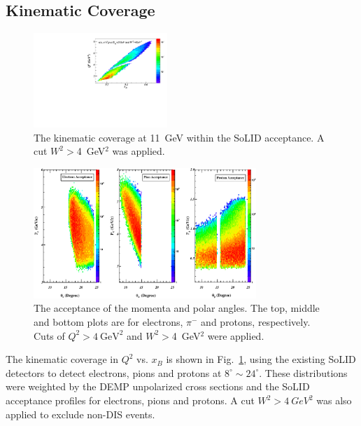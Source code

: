 \subsection{Kinematic Coverage}
\begin{figure}[!ht]
 \begin{center}
      \includegraphics[type=pdf,
        ext=.pdf,read=.pdf,width=0.45\textwidth]{./figures//Q2_x_02Hz}
  
   \caption{\footnotesize{The
kinematic coverage at 11~GeV within the SoLID acceptance. A cut $W^2>$4~GeV$^2$
was applied. }}
  \label{kin_cor}
  \end{center}
\end{figure}
\begin{figure}[!ht]
 \begin{center}
   \includegraphics[type=pdf,
     ext=.pdf,read=.pdf,width=0.75\textwidth]{./figures/dvmp_acceptance_narrow}
   \caption[The acceptance of the momenta and scattering angles for electrons,
     $\pi^{-}$ and protons]{\footnotesize{The acceptance of the momenta and
       polar angles. The top, middle and bottom plots are for electrons,
       $\pi^{-}$ and protons, respectively. Cuts of $Q^{2}>4~\mathrm{GeV^{2}}$
       and $W^2>$4~GeV$^2$ were applied.}}
  \label{p_theta}
  \end{center}
\end{figure}
The kinematic coverage in $Q^{2}$ vs. $x_{B}$ is shown in Fig.~\ref{kin_cor},
using the existing SoLID detectors to detect electrons, pions and protons at
$8^{\circ}\sim24^{\circ}$. These distributions were weighted by the DEMP
unpolarized cross sections and the SoLID acceptance profiles for electrons,
pions and protons.  A cut $W^{2}>4~GeV^{2}$ was also applied to exclude non-DIS
events.

